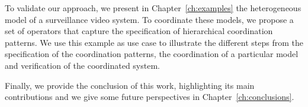 To validate our approach, we present in Chapter~\ref{ch:examples} the heterogeneous model of a surveillance video system. To coordinate these models, we propose a set of \bcool operators that capture the specification of hierarchical coordination patterns. We use this example as use case to illustrate the different steps from the specification of the coordination patterns, the coordination of a particular model and verification of the coordinated system.     

Finally, we provide the conclusion of this work, highlighting its main contributions and we give some future perspectives in Chapter~\ref{ch:conclusions}.

	
	








